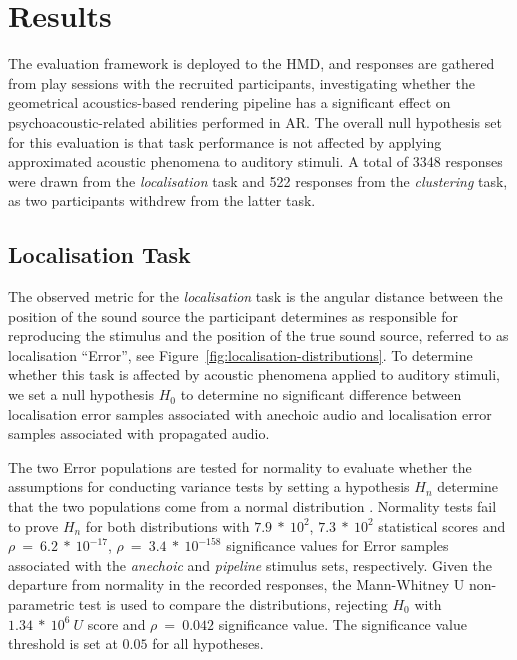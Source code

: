 \section{Results}
The evaluation framework is deployed to the HMD, and responses are gathered from play sessions with the recruited participants, investigating whether the geometrical acoustics-based rendering pipeline has a significant effect on psychoacoustic-related abilities performed in AR. The overall null hypothesis set for this evaluation is that task performance is not affected by applying approximated acoustic phenomena to auditory stimuli. A total of 3348 responses were drawn from the \emph{localisation} task and 522 responses from the \emph{clustering} task, as two participants withdrew from the latter task. \par

\subsection{Localisation Task}
\label{sec:localisation-results}
The observed metric for the \emph{localisation} task is the angular distance between the position of the sound source the participant determines as responsible for reproducing the stimulus and the position of the true sound source, referred to as localisation ``Error'', see Figure~\ref{fig:localisation-distributions}. To determine whether this task is affected by acoustic phenomena applied to auditory stimuli, we set a null hypothesis $H_0$ to determine no significant difference between localisation error samples associated with anechoic audio and localisation error samples associated with propagated audio. \par
The two Error populations are tested for normality to evaluate whether the assumptions for conducting variance tests by setting a hypothesis $H_n$ determine that the two populations come from a normal distribution \citep{pearson1977tests}. Normality tests fail to prove $H_n$ for both distributions with $7.9\ *\ 10^2$, $7.3\ *\ 10^2$ statistical scores and $\rho\ =\ 6.2\ *\ 10^{-17}$, $\rho\ =\ 3.4\ *\ 10^{-158}$ significance values for Error samples associated with the \emph{anechoic} and \emph{pipeline} stimulus sets, respectively. Given the departure from normality in the recorded responses, the Mann-Whitney U non-parametric test is used to compare the distributions, rejecting $H_0$ with $1.34\ *\ 10^6\ U$ score and $\rho\ =\ 0.042$ significance value. The significance value threshold is set at $0.05$ for all hypotheses. \par

